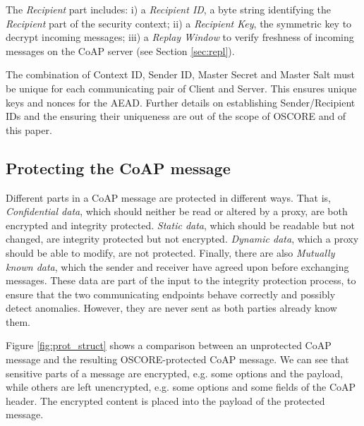 {The \emph{Recipient} part includes: i) a \emph{Recipient ID}, a byte string identifying the \emph{Recipient} part of the security context; ii) a \emph{Recipient Key}, the symmetric key to decrypt incoming messages; iii) a \emph{Replay Window} to verify freshness of incoming messages on the CoAP server (see Section \ref{sec:repl}).

The combination of Context ID, Sender ID, Master Secret and Master Salt must be unique for each communicating pair of Client and Server. This ensures unique keys and nonces for the AEAD. Further details on establishing Sender/Recipient IDs and the ensuring their uniqueness are out of the scope of OSCORE and of this paper.

\subsection{Protecting the CoAP message}
\label{ss:COSE_object}

Different parts in a CoAP message are protected in different ways. That is, \textit{Confidential data}, which should neither be read or altered by a proxy, are both encrypted and integrity protected. \textit{Static data}, which should be readable but not changed, are integrity protected but not encrypted. \textit{Dynamic data}, which a proxy should be able to modify, are not protected. Finally, there are also \textit{Mutually known data}, which the sender and receiver have agreed upon before exchanging messages. These data are part of the input to the integrity protection process, to ensure that the two communicating endpoints behave correctly and possibly detect anomalies. However, they are never sent as both parties already know them.

Figure \ref{fig:prot_struct} shows a comparison between an unprotected CoAP message and the resulting OSCORE-protected CoAP message. We can see that sensitive parts of a message are encrypted, e.g. some options and the payload, while others are left unencrypted, e.g. some options and some fields of the CoAP header. The encrypted content is placed into the payload of the protected message.

}
